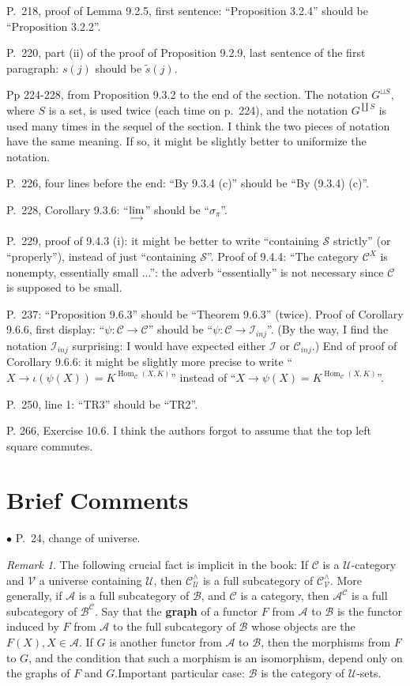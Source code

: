 \documentclass[12pt]{article}
\theoremstyle{remark}%
\newtheorem{rk}[thm]{Remark}
\newcommand{\bu}{\bullet}
\newcommand{\n}{\noindent}
\newcommand{\A}{\mathcal A}
\newcommand{\B}{\mathcal B}
\newcommand{\C}{\mathcal C}
\newcommand{\U}{\mathcal U}
\newcommand{\ilim}{\operatornamewithlimits{\underset{\longrightarrow}{lim}}}
\DeclareMathOperator{\Hom}{Hom}
\begin{document}
\n P.~218, proof of Lemma 9.2.5, first sentence: ``Proposition 3.2.4'' should be ``Proposition 3.2.2''.

\n P.~220, part (ii) of the proof of Proposition 9.2.9, last sentence of the first paragraph: $s(j)$ should be $\tilde s(j)$.

\n Pp 224-228, from Proposition 9.3.2 to the end of the section. The notation $G^{\sqcup S}$, where $S$ is a set, is used twice (each time on p.~224), and the notation $G^{\coprod S}$ is used many times in the sequel of the section. I think the two pieces of notation have the same meaning. If so, it might be slightly better to uniformize the notation.

\n P.~226, four lines before the end: ``By 9.3.4 (c)'' should be ``By (9.3.4) (c)''.

\n P.~228, Corollary 9.3.6: ``$\ilim$'' should be ``$\sigma_\pi$''.

\n P.~229, proof of 9.4.3 (i): it might be better to write ``containing $\mathcal S$ strictly'' (or ``properly''), instead of just ``containing $\mathcal S$''. Proof of 9.4.4: ``The category $\C^X$ is nonempty, essentially small ...'': the adverb ``essentially'' is not necessary since $\C$ is supposed to be small.

\n P.~237: ``Proposition 9.6.3'' should be ``Theorem 9.6.3'' (twice). Proof of Corollary 9.6.6, first display: ``$\psi:\C\to\C$'' should be ``$\psi:\C\to\mathcal I_{inj}$''. (By the way, I find the notation $\mathcal I_{inj}$ surprising: I would have expected either $\mathcal I$ or $\C_{inj}$.) End of proof of Corollary 9.6.6: it might be slightly more precise to write ``$X\to\iota(\psi(X))=K^{\Hom_\C(X,K)}$'' instead of ``$X\to\psi(X)=K^{\Hom_\C(X,K)}$''. 

\n P.~250, line 1: ``TR3'' should be ``TR2''. 

\n P. 266, Exercise 10.6. I think the authors forgot to assume that the top left square commutes. 
%
\section{Brief Comments}\label{bc} %
%
\n$\bu$ P.~24, change of universe. 
% 
\begin{rk}\label{graph} 
The following crucial fact is implicit in the book: If $\C$ is a $\U$-category and $\mathcal V$ a universe containing $\U$, then $\C^\wedge_\U$ is a full subcategory of $\C^\wedge_\mathcal{V}$. More generally, if $\A$ is a full subcategory of $\B$, and $\C$ is a category, then $\A^\C$ is a full subcategory of $\B^\C$. Say that the \textbf{graph} of a functor $F$ from $\A$ to $\B$ is the functor induced by $F$ from $\A$ to the full subcategory of $\B$ whose objects are the $F(X),X\in\A$. If $G$ is another functor from $\A$ to $\B$, then the morphisms from $F$ to $G$, and the condition that such a morphism is an isomorphism, depend only on the graphs of $F$ and $G$.Important particular case: $\B$ is the category of $\U$-sets. 
\end{rk} 
\end{document}
